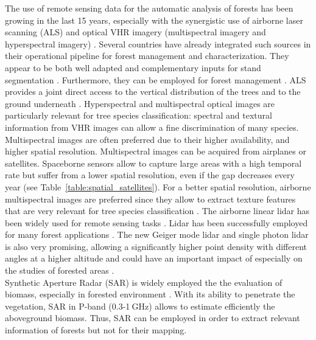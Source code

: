 The use of remote sensing data for the automatic analysis of forests has been growing in the last 15 years, especially with the synergistic use of airborne laser scanning (ALS) and optical VHR imagery (multispectral imagery and hyperspectral imagery) \citep{torabzadeh2014fusion,White2016CJRS}. Several countries have already integrated such sources in their operational pipeline for forest management and characterization. They appear to be both well adapted and complementary inputs for stand segmentation \citep{dalponte2012tree,dalponte2015delineation,7500049}. Furthermore, they can be employed for forest management \citep{tokola2015remote, wulder2008role, patenaude2005synthesis}. ALS provides a joint direct access to the vertical distribution of the trees and to the ground underneath \citep{holmgren2004prediction}. Hyperspectral and multispectral optical images are particularly relevant for tree species classification: spectral and textural information from VHR  images can allow a fine discrimination of many species. Multispectral images are often preferred due to their higher availability, and higher spatial resolution. Multispectral images can be acquired from airplanes or satellites. Spaceborne sensors allow to capture large areas with a high temporal rate but suffer from a lower spatial resolution, even if the gap decreases every year (see Table~\ref{table:spatial_satellites}). For a better spatial resolution, airborne multispectral images are preferred since they allow to extract texture features that are very relevant for tree species classification \citep{franklin2000incorporating}. The airborne linear lidar has been widely used for remote sensing tasks \citep{lim2003lidar, shan2008topographic, vosselman2010airborne}. Lidar has been successfully employed for many forest applications \citep{ferraz2016lidar}. The new Geiger mode lidar \citep{ullrich2016linear} and single photon lidar \citep{viterbini1987single} is also very promising, allowing a significantly higher point density with different angles at a higher altitude and could have an important impact of especially on the studies of forested areas \citep{jakubowski2013tradeoffs, strunk2012effects}. \\

Synthetic Aperture Radar (SAR) is widely employed the the evaluation of biomass, especially in forested environment \citep{le1992relating, beaudoin1994retrieval}. With its ability to penetrate the vegetation, SAR in P-band (0.3-1$\:$GHz) allows to estimate efficiently the aboveground biomass. Thus, SAR can be employed in order to extract relevant information of forests but not for their mapping. 

